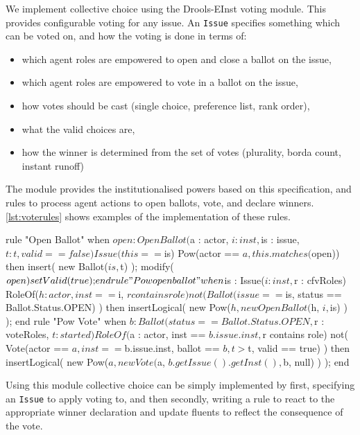 
We implement collective choice using the Drools-EInst voting module. This
provides configurable voting for any issue. An \texttt{Issue} specifies
something which can be voted on, and how the voting is done in terms of:

\begin{itemize}
\item which agent roles are empowered to open and close a ballot on the issue,
\item which agent roles are empowered to vote in a ballot on the issue,
\item how votes should be cast (\eg single choice, preference list, rank order),
\item what the valid choices are,
\item how the winner is determined from the set of votes (\eg plurality, borda count, instant runoff)
\end{itemize}

The module provides the institutionalised powers based on this specification,
and rules to process agent actions to open ballots, vote, and declare winners.
\autoref{lst:voterules} shows examples of the implementation of these rules.

\begin{drools}[label=lst:voterules,caption={Opening of ballots and voting.}]
rule "Open Ballot"
	when
		$open : OpenBallot($a : actor, $i : inst, $is : issue, $t: t, valid == false)
		Issue(this == $is)
		Pow(actor == $a, this.matches($open))
	then
		insert( new Ballot($is, $t) );
		modify($open) {
			setValid(true);
		}
end
rule "Pow open ballot"
	when
		$is : Issue($i : inst, $r : cfvRoles)
		RoleOf($h : actor, inst == $i, $r contains role)
		not( Ballot(issue == $is, status == Ballot.Status.OPEN) )
	then
		insertLogical( new Pow($h, new OpenBallot($h, $i, $is) ) );
end
rule "Pow Vote"
	when
		$b : Ballot(status == Ballot.Status.OPEN, $r : voteRoles, $t : started)
		RoleOf($a : actor, inst == $b.issue.inst, $r contains role)
		not( Vote(actor == $a, inst == $b.issue.inst, ballot == $b, t > $t, valid == true) )
	then
		insertLogical( new Pow($a, new Vote($a, $b.getIssue().getInst(), $b, null) ) );
end
\end{drools}

Using this module collective choice can be simply implemented by first,
specifying an \texttt{Issue} to apply voting to, and then secondly, writing a
rule to react to the appropriate winner declaration and update fluents to
reflect the consequence of the vote.

